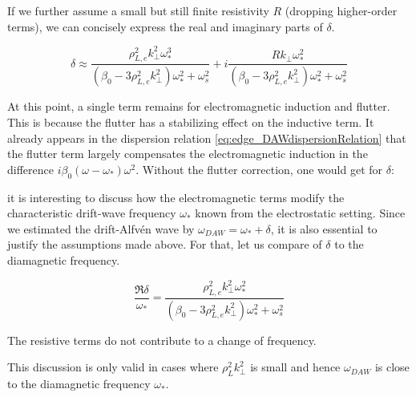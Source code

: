 If we further assume a small but still finite resistivity $R$ (dropping higher-order terms), we can concisely express the real and imaginary parts of $\delta$.

\begin{equation}
	\delta \approx \frac{\rho_{L,e}^2k_\perp^{2} \omega_*^{3} }{\left(\beta_{0}  - 3 \rho_{L,e}^2 k_\perp^{2}\right)\omega_*^{2} + \omega_s^{2}} + i\frac{Rk_\perp\omega_*^{2}}{\left(\beta_{0}  - 3 \rho_{L,e}^2 k_\perp^{2}\right)\omega_*^{2} + \omega_s^{2} }	
\end{equation}

At this point, a single term remains for electromagnetic induction and flutter. This is because the flutter has a stabilizing effect on the inductive term. It already appears in the dispersion relation \ref{eq:edge_DAWdispersionRelation} that the flutter term largely compensates the electromagnetic induction in the difference $i\beta_0\left(\omega - \omega_*\right)\omega^2$. Without the flutter correction, one would get for $\delta$:




it is interesting to discuss how the electromagnetic terms modify the characteristic drift-wave frequency $\omega_*$ known from the electrostatic setting. Since we estimated the drift-Alfvén wave by $\omega_{DAW} = \omega_* + \delta$, it is also essential to justify the assumptions made above. For that, let us compare of $\delta$ to the diamagnetic frequency. 

\begin{equation}
	\frac{\Re{\delta}}{\omega_*} = \frac{\rho_{L,e}^2k_\perp^{2} \omega_*^{2} }{\left(\beta_{0}  - 3 \rho_{L,e}^2 k_\perp^{2}\right)\omega_*^{2} + \omega_s^{2} }
\end{equation}

The resistive terms do not contribute to a change of frequency. 

This discussion is only valid in cases where $\rho_L^2k_\perp^2$ is small and hence $\omega_{DAW}$ is close to the diamagnetic frequency $\omega_*$. 




